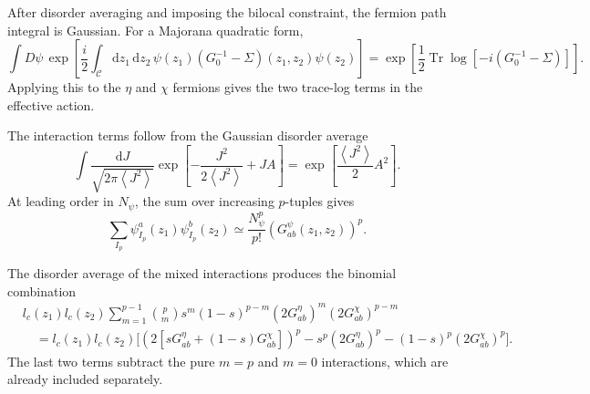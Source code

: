 \documentclass[11pt,a4paper]{article}
\begin{document}
After disorder averaging and imposing the bilocal constraint, the fermion path integral is Gaussian.  For a Majorana
quadratic form,
\begin{equation}
\label{eq:majorana-trace-log}
  \int D\psi\,
  \exp\left[
  \frac{i}{2}
  \int_{\mathcal{C}}\mathrm{d}z_1\,\mathrm{d}z_2\,
  \psi(z_1)
  \left(G_0^{-1}-\Sigma\right)(z_1,z_2)
  \psi(z_2)
  \right]
  =
  \exp\left[
  \frac{1}{2}
  \operatorname{Tr}\log
  \left[-i\left(G_0^{-1}-\Sigma\right)\right]
  \right].
\end{equation}
Applying this to the \(\eta\) and
\(\chi\) fermions gives the two trace-log terms in the effective action.

The interaction terms follow from the Gaussian disorder average
\begin{equation}
\label{eq:gaussian-disorder-average}
  \int
  \frac{\mathrm{d}J}{\sqrt{2\pi\left\langle J^2\right\rangle}}
  \exp\left[
  -\frac{J^2}{2\left\langle J^2\right\rangle}
  +
  JA
  \right]
  =
  \exp\left[
  \frac{\left\langle J^2\right\rangle}{2}A^2
  \right].
\end{equation}
At leading order in \(N_\psi\), the sum over increasing \(p\)-tuples gives
\begin{equation}
\label{eq:large-N-tuple-sum}
  \sum_{I_p}
  \psi^a_{I_p}(z_1)\psi^b_{I_p}(z_2)
  \simeq
  \frac{N_\psi^p}{p!}
  \left(
  G^\psi_{ab}(z_1,z_2)
  \right)^p .
\end{equation}

The disorder average of the mixed interactions produces the binomial
combination
\begin{equation}
\begin{aligned}
&l_c(z_1)l_c(z_2)
\sum_{m=1}^{p-1}
\binom{p}{m}s^m(1-s)^{p-m}
\left(2G^\eta_{ab}\right)^m
\left(2G^\chi_{ab}\right)^{p-m}
\\
&\quad =
l_c(z_1)l_c(z_2)
\Bigg[
\left(
2\left[sG^\eta_{ab}+(1-s)G^\chi_{ab}\right]
\right)^p
-s^p\left(2G^\eta_{ab}\right)^p
-(1-s)^p\left(2G^\chi_{ab}\right)^p
\Bigg].
\end{aligned}
\label{eq:S-mixed-binomial}
\end{equation}
The last two terms subtract the pure \(m=p\) and \(m=0\) interactions, which
are already included separately.
\end{document}
